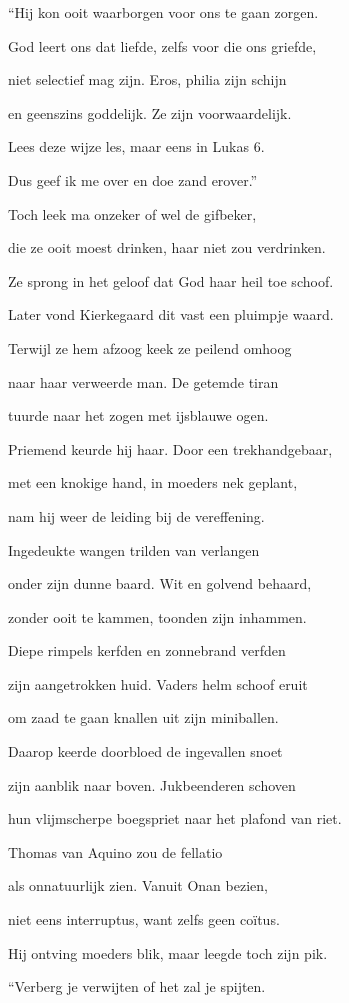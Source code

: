 “Hij kon ooit waarborgen
voor ons te gaan zorgen.

God leert ons dat liefde,
zelfs voor die ons griefde,

niet selectief mag zijn.
Eros, philia zijn schijn

en geenszins goddelijk.
Ze zijn voorwaardelijk.

Lees deze wijze les,
maar eens in Lukas 6.

Dus geef ik me over
en doe zand erover.”

Toch leek ma onzeker
of wel de gifbeker,

die ze ooit moest drinken,
haar niet zou verdrinken.

Ze sprong in het geloof
dat God haar heil toe schoof.

Later vond Kierkegaard
dit vast een pluimpje waard.

Terwijl ze hem afzoog
keek ze peilend omhoog

naar haar verweerde man.
De getemde tiran

tuurde naar het zogen
met ijsblauwe ogen.

Priemend keurde hij haar.
Door een trekhandgebaar,

met een knokige hand,
in moeders nek geplant,

nam hij weer de leiding
bij de vereffening.

Ingedeukte wangen
trilden van verlangen

onder zijn dunne baard.
Wit en golvend behaard,

zonder ooit te kammen,
toonden zijn inhammen.

Diepe rimpels kerfden
en zonnebrand verfden

zijn aangetrokken huid.
Vaders helm schoof eruit

om zaad te gaan knallen
uit zijn miniballen.

Daarop keerde doorbloed
de ingevallen snoet

zijn aanblik naar boven.
Jukbeenderen schoven

hun vlijmscherpe boegspriet
naar het plafond van riet.

Thomas van Aquino
zou de fellatio

als onnatuurlijk zien.
Vanuit Onan bezien,

niet eens interruptus,
want zelfs geen coïtus.

Hij ontving moeders blik,
maar leegde toch zijn pik.

“Verberg je verwijten
of het zal je spijten.

